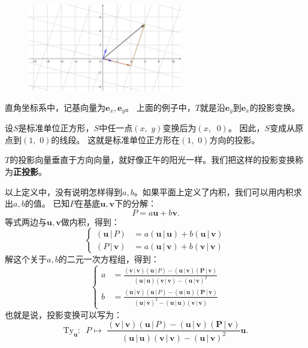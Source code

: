 \documentclass[12pt,UTF8]{ctexbook}
\begin{document}
\begin{figure}[h] %
    \centering
    \includegraphics[width=0.6\textwidth]{投影变换例2.png}
\end{figure}

直角坐标系中，记基向量为$\mathbf{e}_x, \mathbf{e}_y$。 
上面的例子中，$T$就是沿$\mathbf{e}_y$到$\mathbf{e}_x$的投影变换。

设$S$是标准单位正方形，$S$中任一点$(x,\,\,y)$变换后为$(x,\,\,\ 0)$。
因此，$S$变成从原点到$(1,\,\,0)$的线段。
这就是标准单位正方形在$(1,\,\,0)$方向的投影。

$T$的投影向量垂直于方向向量，就好像正午的阳光一样。我们把这样的投影变换称为\textbf{正投影}。

以上定义中，没有说明怎样得到$a, b$。如果平面上定义了内积，我们可以用内积求出$a, b$的值。
已知$P$在基底$\mathbf{u}, \mathbf{v}$下的分解：
$$ P = a\mathbf{u} + b\mathbf{v}.$$
等式两边与$\mathbf{u}, \mathbf{v}$做内积，得到：
$$ 
  \left\{ \begin{array}{lc}
    (\mathbf{u}\,|\,P) &= a(\mathbf{u}\,|\,\mathbf{u}) + b(\mathbf{u}\,|\,\mathbf{v}) \\
    (P\,|\,\mathbf{v}) &= a(\mathbf{u}\,|\,\mathbf{v}) + b(\mathbf{v}\,|\,\mathbf{v})
  \end{array}\right.
$$
解这个关于$a, b$的二元一次方程组，得到：
$$ 
  \left\{ \begin{array}{cc}
    a &= \frac{(\mathbf{v}\,|\,\mathbf{v})(\mathbf{u}\,|\,P) - (\mathbf{u}\,|\,\mathbf{v})(\mathbf{P}\,|\,\mathbf{v})}{(\mathbf{u}\,|\,\mathbf{u})(\mathbf{v}\,|\,\mathbf{v}) - (\mathbf{u}\,|\,\mathbf{v})^2} \\
    b &= \frac{(\mathbf{u}\,|\,\mathbf{v})(\mathbf{u}\,|\,P) - (\mathbf{u}\,|\,\mathbf{u})(\mathbf{P}\,|\,\mathbf{v})}{(\mathbf{u}\,|\,\mathbf{v})^2 - (\mathbf{u}\,|\,\mathbf{u})(\mathbf{v}\,|\,\mathbf{v})}
  \end{array}\right.
$$
也就是说，投影变换可以写为：
$$ \mathrm{Ty}_\mathbf{u} :\,\,\, P \mapsto \,\, \frac{(\mathbf{v}\,|\,\mathbf{v})(\mathbf{u}\,|\,P) - (\mathbf{u}\,|\,\mathbf{v})(\mathbf{P}\,|\,\mathbf{v})}{(\mathbf{u}\,|\,\mathbf{u})(\mathbf{v}\,|\,\mathbf{v}) - (\mathbf{u}\,|\,\mathbf{v})^2}\mathbf{u}. $$
\end{document}
